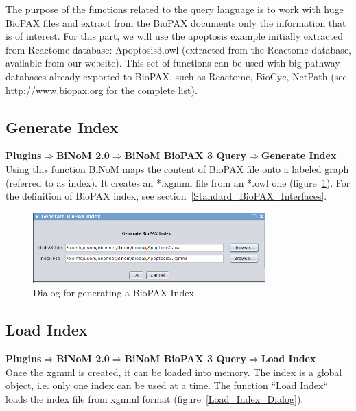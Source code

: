 The purpose of the functions related to the query language is to work with huge
BioPAX files and extract from the BioPAX documents only the information that is
of interest. For this part, we will use the apoptosis example initially
extracted from Reactome database: Apoptosis3.owl (extracted from the Reactome
database, available from our website). This set of functions can be used with
big pathway databases already exported to BioPAX, such as Reactome, BioCyc,
NetPath (see \url{http://www.biopax.org} for the complete list).

\subsection{Generate Index}
\textbf{Plugins$\Rightarrow$BiNoM 2.0$\Rightarrow$BiNoM BioPAX 3 Query$\Rightarrow$Generate Index}\\

Using this function BiNoM maps the content of BioPAX file onto a labeled graph
(referred to as index). It creates an *.xgmml file from an *.owl one
(figure~\ref{Generate_BioPAX_Index}). For the definition of BioPAX index, see
section~\ref{Standard_BioPAX_Interfaces}.

\begin{figure}
\centering
\includegraphics[width=0.8\textwidth]{graphics/ebo_generate_BioPAX_Index}
\caption{Dialog for generating a BioPAX Index.}
\label{Generate_BioPAX_Index}
\end{figure}

\subsection{Load Index}
\textbf{Plugins$\Rightarrow$BiNoM 2.0$\Rightarrow$BiNoM BioPAX 3 Query$\Rightarrow$Load Index}\\

Once the xgmml is created, it can be loaded into memory. The index is a global
object, i.e. only one index can be used at a time. The function ``Load Index`` loads the index
file from xgmml format (figure~\ref{Load_Index_Dialog}).\\\\

